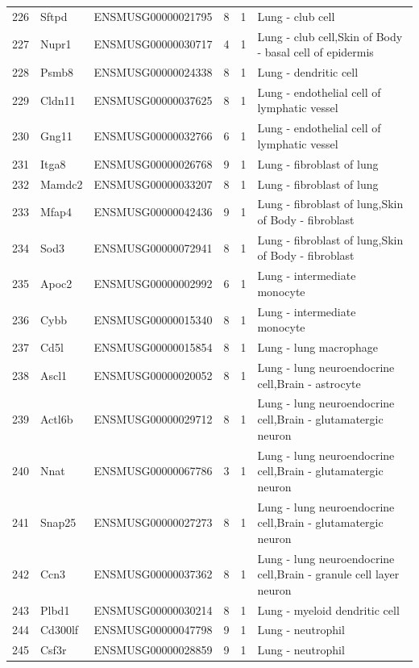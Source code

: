\begin{table}[ht]
{\begin{tabular}{lllrrl}
        226 & Sftpd & ENSMUSG00000021795 & 8 & 1 & Lung - club cell \\
        227 & Nupr1 & ENSMUSG00000030717 & 4 & 1 & Lung - club cell,Skin of Body - basal cell of epidermis \\
        228 & Psmb8 & ENSMUSG00000024338 & 8 & 1 & Lung - dendritic cell \\
        229 & Cldn11 & ENSMUSG00000037625 & 8 & 1 & Lung - endothelial cell of lymphatic vessel \\
        230 & Gng11 & ENSMUSG00000032766 & 6 & 1 & Lung - endothelial cell of lymphatic vessel \\
        231 & Itga8 & ENSMUSG00000026768 & 9 & 1 & Lung - fibroblast of lung \\
        232 & Mamdc2 & ENSMUSG00000033207 & 8 & 1 & Lung - fibroblast of lung \\
        233 & Mfap4 & ENSMUSG00000042436 & 9 & 1 & Lung - fibroblast of lung,Skin of Body - fibroblast \\
        234 & Sod3 & ENSMUSG00000072941 & 8 & 1 & Lung - fibroblast of lung,Skin of Body - fibroblast \\
        235 & Apoc2 & ENSMUSG00000002992 & 6 & 1 & Lung - intermediate monocyte \\
        236 & Cybb & ENSMUSG00000015340 & 8 & 1 & Lung - intermediate monocyte \\
        237 & Cd5l & ENSMUSG00000015854 & 8 & 1 & Lung - lung macrophage \\
        238 & Ascl1 & ENSMUSG00000020052 & 8 & 1 & Lung - lung neuroendocrine cell,Brain - astrocyte \\
        239 & Actl6b & ENSMUSG00000029712 & 8 & 1 & Lung - lung neuroendocrine cell,Brain - glutamatergic neuron \\
        240 & Nnat & ENSMUSG00000067786 & 3 & 1 & Lung - lung neuroendocrine cell,Brain - glutamatergic neuron \\
        241 & Snap25 & ENSMUSG00000027273 & 8 & 1 & Lung - lung neuroendocrine cell,Brain - glutamatergic neuron \\
        242 & Ccn3 & ENSMUSG00000037362 & 8 & 1 & Lung - lung neuroendocrine cell,Brain - granule cell layer neuron \\
        243 & Plbd1 & ENSMUSG00000030214 & 8 & 1 & Lung - myeloid dendritic cell \\
        244 & Cd300lf & ENSMUSG00000047798 & 9 & 1 & Lung - neutrophil \\
        245 & Csf3r & ENSMUSG00000028859 & 9 & 1 & Lung - neutrophil \\

\end{tabular}}
\end{table}
